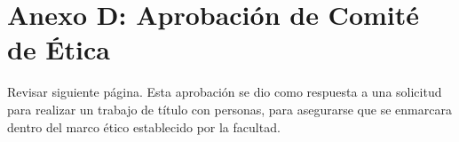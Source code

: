 \chapter*{Anexo D: Aprobación de Comité de Ética}\label{AnexoD}

Revisar siguiente página. Esta aprobación se dio como respuesta a una solicitud para realizar un trabajo de título con personas, para asegurarse que se enmarcara dentro del marco ético establecido por la facultad.


\begin{figure}[h]
   \centering
\end{figure}

